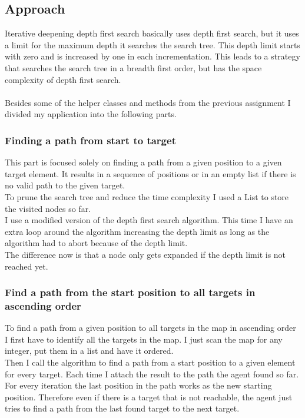\documentclass[paper=a4, fontsize=11pt]{scrartcl} %
\numberwithin{equation}{section} %
\numberwithin{figure}{section} %
\numberwithin{table}{section} %
\begin{document}
\subsection{Approach}
Iterative deepening depth first search basically uses depth first search, but it uses a limit for the maximum depth it searches the search tree. This depth limit starts with zero and is increased by one in each incrementation. This leads to a strategy that searches the search tree in a breadth first order, but has the space complexity of depth first search.\\\\

Besides some of the helper classes and methods from the previous assignment I divided my application into the following parts. 

\subsubsection{Finding a path from start to target}
This part is focused solely on finding a path from a given position to a given target element. It results in a sequence of positions or in an empty list if there is no valid path to the given target.\\
To prune the search tree and reduce the time complexity I used a List to store the visited nodes so far.\\
I use a modified version of the depth first search algorithm. This time I have an extra loop around the algorithm increasing the depth limit as long as the algorithm had to abort because of the depth limit.\\
The difference now is that a node only gets expanded if the depth limit is not reached yet.

\subsubsection{Find a path from the start position to all targets in ascending order}
To find a path from a given position to all targets in the map in ascending order I first have to identify all the targets in the map. I just scan the map for any integer, put them in a list and have it ordered.\\
Then I call the algorithm to find a path from a start position to a given element for every target. Each time I attach the result to the path the agent found so far. For every iteration the last position in the path works as the new starting position. Therefore even if there is a target that is not reachable, the agent just tries to find a path from the last found target to the next target.
\end{document}
